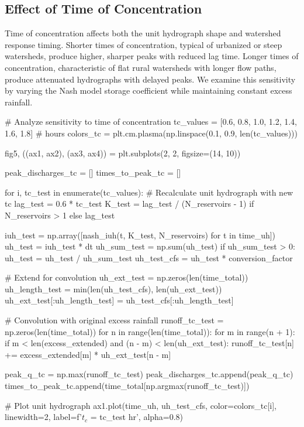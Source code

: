 \documentclass[a4paper, 11pt]{article}
\begin{document}
\subsection{Effect of Time of Concentration}

Time of concentration affects both the unit hydrograph shape and watershed response timing.
Shorter times of concentration, typical of urbanized or steep watersheds, produce higher,
sharper peaks with reduced lag time. Longer times of concentration, characteristic of flat
rural watersheds with longer flow paths, produce attenuated hydrographs with delayed peaks.
We examine this sensitivity by varying the Nash model storage coefficient while maintaining
constant excess rainfall.

\begin{pycode}
# Analyze sensitivity to time of concentration
tc_values = [0.6, 0.8, 1.0, 1.2, 1.4, 1.6, 1.8]  # hours
colors_tc = plt.cm.plasma(np.linspace(0.1, 0.9, len(tc_values)))

fig5, ((ax1, ax2), (ax3, ax4)) = plt.subplots(2, 2, figsize=(14, 10))

peak_discharges_tc = []
times_to_peak_tc = []

for i, tc_test in enumerate(tc_values):
    # Recalculate unit hydrograph with new tc
    lag_test = 0.6 * tc_test
    K_test = lag_test / (N_reservoirs - 1) if N_reservoirs > 1 else lag_test

    iuh_test = np.array([nash_iuh(t, K_test, N_reservoirs) for t in time_uh])
    uh_test = iuh_test * dt
    uh_sum_test = np.sum(uh_test)
    if uh_sum_test > 0:
        uh_test = uh_test / uh_sum_test
    uh_test_cfs = uh_test * conversion_factor

    # Extend for convolution
    uh_ext_test = np.zeros(len(time_total))
    uh_length_test = min(len(uh_test_cfs), len(uh_ext_test))
    uh_ext_test[:uh_length_test] = uh_test_cfs[:uh_length_test]

    # Convolution with original excess rainfall
    runoff_tc_test = np.zeros(len(time_total))
    for n in range(len(time_total)):
        for m in range(n + 1):
            if m < len(excess_extended) and (n - m) < len(uh_ext_test):
                runoff_tc_test[n] += excess_extended[m] * uh_ext_test[n - m]

    peak_q_tc = np.max(runoff_tc_test)
    peak_discharges_tc.append(peak_q_tc)
    times_to_peak_tc.append(time_total[np.argmax(runoff_tc_test)])

    # Plot unit hydrograph
    ax1.plot(time_uh, uh_test_cfs, color=colors_tc[i], linewidth=2,
             label=f'$t_c$ = {tc_test} hr', alpha=0.8)


\end{pycode}
\end{document}
